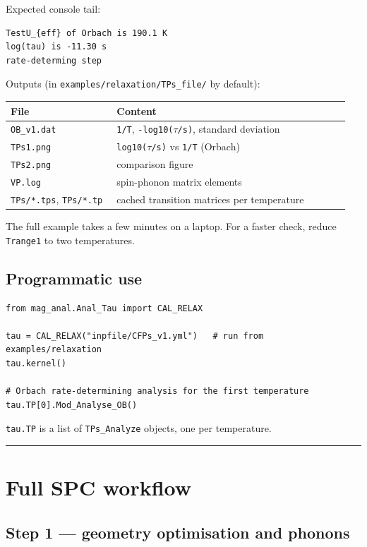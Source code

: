 \documentclass[11pt,a4paper]{article}
\begin{document}
Expected console tail:

\begin{lstlisting}
TestU_{eff} of Orbach is 190.1 K
log(tau) is -11.30 s
rate-determing step
\end{lstlisting}

Outputs (in \texttt{examples/relaxation/TPs\_file/} by default):

\begin{longtable}[]{@{}>{\raggedright\arraybackslash}p{0.30\linewidth} >{\raggedright\arraybackslash}p{0.66\linewidth}@{}}
\toprule
File & Content\tabularnewline
\midrule
\endhead
\texttt{OB\_v1.dat} & \texttt{1/T}, \texttt{-log10(\(\tau\)/s)}, standard
deviation\tabularnewline
\texttt{TPs1.png} & \texttt{log10(\(\tau\)/s)} vs \texttt{1/T}
(Orbach)\tabularnewline
\texttt{TPs2.png} & comparison figure\tabularnewline
\texttt{VP.log} & spin-phonon matrix elements\tabularnewline
\texttt{TPs/*.tps}, \texttt{TPs/*.tp} & cached transition matrices per
temperature\tabularnewline
\bottomrule
\end{longtable}

The full example takes a few minutes on a laptop. For a faster check,
reduce \texttt{Trange1} to two temperatures.

\subsection{Programmatic use}\label{programmatic-use}

\begin{lstlisting}
from mag_anal.Anal_Tau import CAL_RELAX

tau = CAL_RELAX("inpfile/CFPs_v1.yml")   # run from examples/relaxation
tau.kernel()

# Orbach rate-determining analysis for the first temperature
tau.TP[0].Mod_Analyse_OB()
\end{lstlisting}

\texttt{tau.TP} is a list of \texttt{TPs\_Analyze} objects, one per
temperature.

\begin{center}\rule{0.5\linewidth}{0.4pt}\end{center}

\section{Full SPC workflow}\label{full-spc-workflow}

\subsection{Step 1 --- geometry optimisation and
phonons}\label{step-1-geometry-optimisation-and-phonons}
\end{document}

